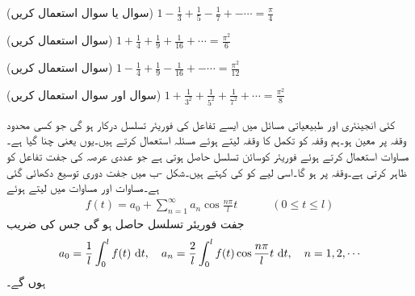 \quad(سوال  یا سوال   استعمال کریں) \quad 
$1-\tfrac{1}{3}+\tfrac{1}{5}-\tfrac{1}{7}+-\cdots=\tfrac{\pi}{4}$

\quad(سوال  استعمال کریں) \quad
$1+\tfrac{1}{4}+\tfrac{1}{9}+\tfrac{1}{16}+\cdots=\tfrac{\pi^2}{6}$

\quad(سوال  استعمال کریں) \quad 
$1-\tfrac{1}{4}+\tfrac{1}{9}-\tfrac{1}{16}+-\cdots=\tfrac{\pi^2}{12}$

\quad(سوال  اور سوال  استعمال کریں) \quad 
$1+\tfrac{1}{3^2}+\tfrac{1}{5^2}+\tfrac{1}{7^2}+\cdots=\tfrac{\pi^2}{8}$


کئی انجینئری اور طبیعیاتی مسائل میں ایسے تفاعل  کی فوریئر تسلسل درکار ہو گی جو کسی محدود وقفہ   پر معین ہو۔ہم وقفہ  کو تکمل کا وقفہ  لیتے ہوئے مسئلہ  استعمال کرتے ہیں۔یوں  یعنی  چنا گیا ہے۔ مساوات  استعمال کرتے ہوئے فوریئر کوسائن تسلسل حاصل ہوتی ہے جو  عددی عرصہ کی جفت تفاعل   کو ظاہر کرتی ہے۔وقفہ   پر  ہو گا۔اسی لیے  کو  کی  کہتے ہیں۔شکل -ب میں جفت دوری توسیع دکھائی گئی ہے۔مساوات  اور مساوات  میں  لیتے ہوئے 
\begin{align}\label{مساوات_فوریئر_نصف_سعت_توسیع_جفت}
f(t)=a_0+\sum_{n=1}^{\infty} a_n\cos \frac{n\pi}{l}t\quad \quad \quad (0\le t\le l)
\end{align}
جفت فوریئر تسلسل حاصل ہو گی جس کی  ضریب 
\begin{align}\label{مساوات_فوریئر_نصف_سعت_توسیع_جفت_عددی_سر}
a_0=\frac{1}{l}\int_{0}^{l}f(t)\,\dif t,\quad a_n=\frac{2}{l}\int_0^l f(t)\cos \frac{n\pi}{l}t\,\dif t,\quad n=1,2,\cdots
\end{align}
ہوں گے۔

